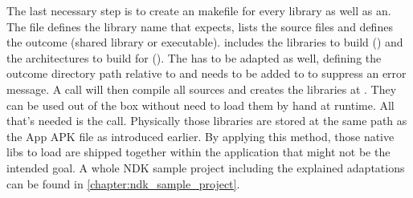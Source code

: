The last necessary step is to create an  makefile for every library as well as an. The  file defines the library name that  expects, lists the source files and defines the outcome (shared library or executable).  includes
the libraries to build () and the architectures to build for
(). The  has to be adapted as well, defining the
outcome directory path relative to  and  needs to be added to  to suppress an error message.
A  call will then compile all sources and creates the libraries
at . They can be used out of the box without need to load them by hand
at runtime. All that's needed is the  call. Physically those libraries are stored at the same path as the App APK file as introduced earlier. By applying this method, those native libs to load are shipped together within the application that might not be the intended goal. A whole NDK sample project including the explained adaptations can be found in \autoref{chapter:ndk_sample_project}.

